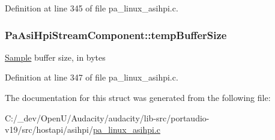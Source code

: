Definition at line 345 of file pa\+\_\+linux\+\_\+asihpi.\+c.

\subsubsection[{\texorpdfstring{temp\+Buffer\+Size}{tempBufferSize}}]{ Pa\+Asi\+Hpi\+Stream\+Component\+::temp\+Buffer\+Size}\hypertarget{struct_pa_asi_hpi_stream_component_a7b8eeeb20693a1f1deb0b41c2800c6a7}{}\label{struct_pa_asi_hpi_stream_component_a7b8eeeb20693a1f1deb0b41c2800c6a7}
\hyperlink{struct_sample}{Sample} buffer size, in bytes 

Definition at line 347 of file pa\+\_\+linux\+\_\+asihpi.\+c.



The documentation for this struct was generated from the following file\+:\begin{DoxyCompactItemize}
\item 
C\+:/\+\_\+dev/\+Open\+U/\+Audacity/audacity/lib-\/src/portaudio-\/v19/src/hostapi/asihpi/\hyperlink{pa__linux__asihpi_8c}{pa\+\_\+linux\+\_\+asihpi.\+c}\end{DoxyCompactItemize}
